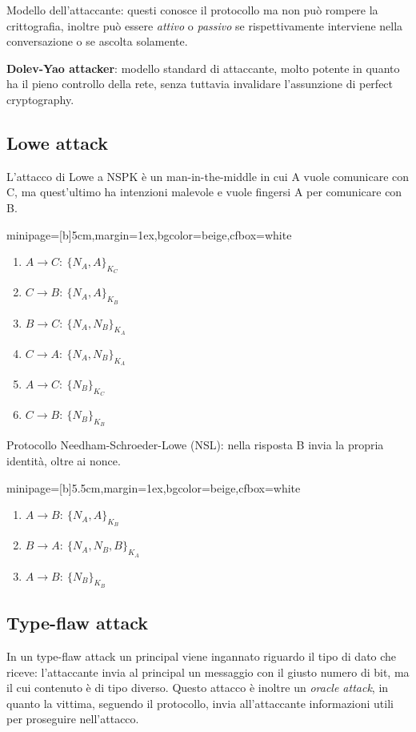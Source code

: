 \documentclass[a4paper, 11pt, twoside, openright, fleqn]{report}
\newcommand{\fromto}[2]{#1\rightarrow #2\!:\ }
\newenvironment{colbox}[2]%
{%
	\par\noindent\hspace{10pt}
	\begin{adjustbox}{minipage=[b]{#2},margin=1ex,bgcolor=#1,cfbox=white}
}{%
	\end{adjustbox}\newline%
}
\begin{document}
\noindent
Modello dell'attaccante: questi conosce il protocollo ma non può rompere la crittografia, inoltre può essere \emph{attivo} o \emph{passivo} se rispettivamente interviene nella conversazione o se ascolta solamente.

\textbf{Dolev-Yao attacker}: modello standard di attaccante, molto potente in quanto ha il pieno controllo della rete, senza tuttavia invalidare l'assunzione di perfect cryptography.

\subsection{Lowe attack}
L'attacco di Lowe a NSPK è un man-in-the-middle in cui A vuole comunicare con C, ma quest'ultimo ha intenzioni malevole e vuole fingersi A per comunicare con B.
\begin{colbox}{beige}{5cm}
	\begin{enumerate}
		\item $\fromto{A}{C}\{N_A,A\}_{K_C}$
		\item $\fromto{C}{B}\{N_A,A\}_{K_B}$
		\item $\fromto{B}{C}\{N_A,N_B\}_{K_A}$
		\item $\fromto{C}{A}\{N_A,N_B\}_{K_A}$
		\item $\fromto{A}{C}\{N_B\}_{K_C}$
		\item $\fromto{C}{B}\{N_B\}_{K_B}$
	\end{enumerate}
\end{colbox}
Protocollo Needham-Schroeder-Lowe (NSL): nella risposta B invia la propria identità, oltre ai nonce.
\begin{colbox}{beige}{5.5cm}
	\begin{enumerate}
		\item $\fromto{A}{B}\{N_A,A\}_{K_B}$
		\item $\fromto{B}{A}\{N_A,N_B,B\}_{K_A}$
		\item $\fromto{A}{B}\{N_B\}_{K_B}$
	\end{enumerate}
\end{colbox}

\subsection{Type-flaw attack}
In un type-flaw attack un principal viene ingannato riguardo il tipo di dato che riceve: l'attaccante invia al principal un messaggio con il giusto numero di bit, ma il cui contenuto è di tipo diverso. Questo attacco è inoltre un \emph{oracle attack}, in quanto la vittima, seguendo il protocollo, invia all'attaccante informazioni utili per proseguire nell'attacco.
\end{document}
